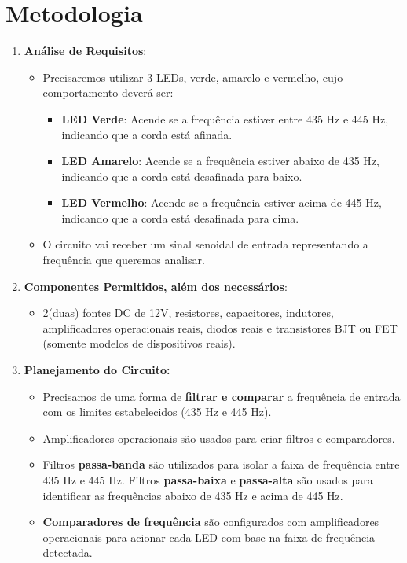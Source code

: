 \documentclass[a4paper, 12pt]{article}
\begin{document}
\section{Metodologia}

\begin{enumerate}
    \item \textbf{Análise de Requisitos}:
    \begin{itemize}
    \item Precisaremos utilizar 3 LEDs, verde, amarelo e vermelho, cujo comportamento deverá ser:
    \begin{itemize}
        \item \textbf{LED Verde}: Acende se a frequência estiver entre 435 Hz e 445 Hz, indicando que a corda está afinada.
        \item \textbf{LED Amarelo}: Acende se a frequência estiver abaixo de 435 Hz, indicando que a corda está desafinada para baixo.
        \item \textbf{LED Vermelho}: Acende se a frequência estiver acima de 445 Hz, indicando que a corda está desafinada para cima.
    \end{itemize}
    \item O circuito vai receber um sinal senoidal de entrada representando a frequência que queremos analisar.
    
\end{itemize}
\item \textbf{Componentes Permitidos, além dos necessários}:
\begin{itemize}
    \item  2(duas) fontes DC de 12V, resistores, capacitores, indutores, amplificadores operacionais reais, diodos reais e transistores BJT ou FET (somente modelos de dispositivos reais).
\end{itemize}

\item \textbf{Planejamento do Circuito:}

\begin{itemize}
    \item Precisamos de uma forma de \textbf{filtrar e comparar} a frequência de entrada com os limites estabelecidos (435 Hz e 445 Hz).
    \item Amplificadores operacionais são usados para criar filtros e comparadores.
    \item Filtros \textbf{passa-banda } são utilizados para isolar a faixa de frequência entre 435 Hz e 445 Hz. Filtros \textbf{passa-baixa} e \textbf{passa-alta} são usados para identificar as frequências abaixo de 435 Hz e acima de 445 Hz.
    \item \textbf{Comparadores de frequência} são configurados com amplificadores operacionais para acionar cada LED com base na faixa de frequência detectada.
\end{itemize}
\end{enumerate}
\end{document}
